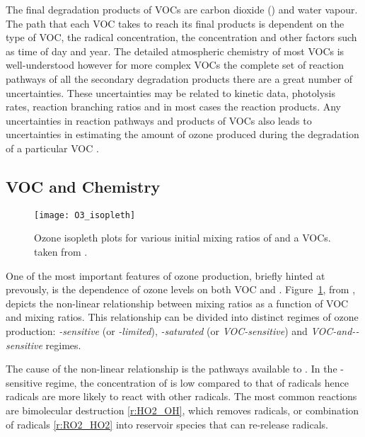 The final degradation products of VOCs are carbon dioxide () and water vapour. 
The path that each VOC takes to reach its final products is dependent on the type of VOC, the radical concentration, the  concentration and other factors such as time of day and year. 
The detailed atmospheric chemistry of most VOCs is well-understood however for more complex VOCs the complete set of reaction pathways of all the secondary degradation products there are a great number of uncertainties. 
These uncertainties may be related to kinetic data, photolysis rates, reaction branching ratios and in most cases the reaction products.
Any uncertainties in reaction pathways and products of VOCs also leads to uncertainties in estimating the amount of ozone produced during the degradation of a particular VOC \citep{Atkinson:2000}.

\subsection[VOC and NOx Chemistry]{VOC and  Chemistry} \label{ss:VOC&NOx}
\begin{figure}
	\begin{center}
        \caption[Ozone mixing ratios as a function of  and VOC]{Ozone isopleth plots for various initial mixing ratios of  and a VOCs. taken from \citet{Jenkin:2000}.}
        \texttt{[image: O3\_isopleth]}
		\label{f:O3_isopleth}
	\end{center}
\end{figure}
One of the most important features of ozone production, briefly hinted at prevously, is the dependence of ozone levels on both VOC and .
Figure~\ref{f:O3_isopleth}, from \citet{Jenkin:2000}, depicts the non-linear relationship between  mixing ratios as a function of VOC and  mixing ratios.  
This relationship can be divided into distinct regimes of ozone production: \emph{-sensitive} (or \emph{-limited}), \emph{-saturated} (or \emph{VOC-sensitive}) and \emph{VOC-and--sensitive} regimes. 

The cause of the non-linear relationship is the pathways available to .
In the -sensitive regime, the concentration of  is low compared to that of radicals hence radicals are more likely to react with other radicals. 
The most common reactions are bimolecular destruction \eqref{r:HO2_OH}, which removes radicals, or combination of radicals \eqref{r:RO2_HO2} into reservoir species that can re-release radicals.

